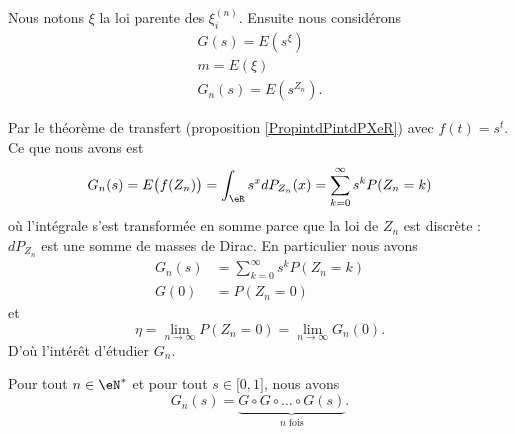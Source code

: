 Nous notons \( \xi\) la loi parente des \( \xi_i^{(n)}\). Ensuite nous considérons 
\begin{subequations}
    \begin{align}
        G(s)=E(s^{\xi})\\
        m=E(\xi)\\
        G_n(s)=E(s^{Z_n}).
    \end{align}
\end{subequations}

    Par le théorème de transfert (proposition \ref{PropintdPintdPXeR}) avec \( f(t)=s^t\). Ce que nous avons est
    \begin{equation}        \label{EqNRtXdC}
        G_n(s)=E\big( f(Z_n) \big)=\int_{\eR}s^xdP_{Z_n}(x)=\sum_{k=0}^{\infty}s^kP(Z_n=k)
    \end{equation}
    où l'intégrale s'est transformée en somme parce que la loi de \( Z_n\) est discrète : \( dP_{Z_n}\) est une somme de masses de Dirac. En particulier nous avons
    \begin{subequations}
        \begin{align}
            G_n(s)&=\sum_{k=0}^{\infty}s^kP(Z_n=k)\\
            G(0)&=P(Z_n=0)
        \end{align}
    \end{subequations}
    et
    \begin{equation}
        \eta=\lim_{n\to \infty} P(Z_n=0)=\lim_{n\to \infty} G_n(0).
    \end{equation}
    D'où l'intérêt d'étudier \( G_n\).

\begin{lemma}       \label{LemezrOiI}
    Pour tout \( n\in \eN^*\) et pour tout \( s\in\mathopen[ 0 , 1 \mathclose]\), nous avons
    \begin{equation}
        G_n(s)=\underbrace{G\circ G\circ\ldots\circ G(s)}_{ n\text{ fois}}.
    \end{equation}
\end{lemma}

